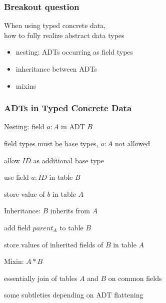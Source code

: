 \documentclass{beamer}
\begin{document}
\begin{frame}\frametitle{Breakout question}
When using typed concrete data,\\
how to fully realize abstract data types
\begin{itemize}
\item nesting: ADTs occurring as field types
\item inheritance between ADTs
\item mixins
\end{itemize}
\end{frame}

\begin{frame}\frametitle{ADTs in Typed Concrete Data}
\begin{blockitems}{Nesting: field $a:A$ in ADT $B$}
\item field types must be base types, $a:A$ not allowed
\item allow $ID$ as additional base type
\item use field $a:ID$ in table $B$
\item store value of $b$ in table $A$
\end{blockitems}

\begin{blockitems}{Inheritance: $B$ inherits from $A$}
\item add field $parent_A$ to table $B$
\item store values of inherited fields of $B$ in table $A$
\end{blockitems}

\begin{blockitems}{Mixin: $A*B$}
\item essentially join of tables $A$ and $B$ on common fields
\item some subtleties depending on ADT flattening
\end{blockitems}
\end{frame}
\end{document}

